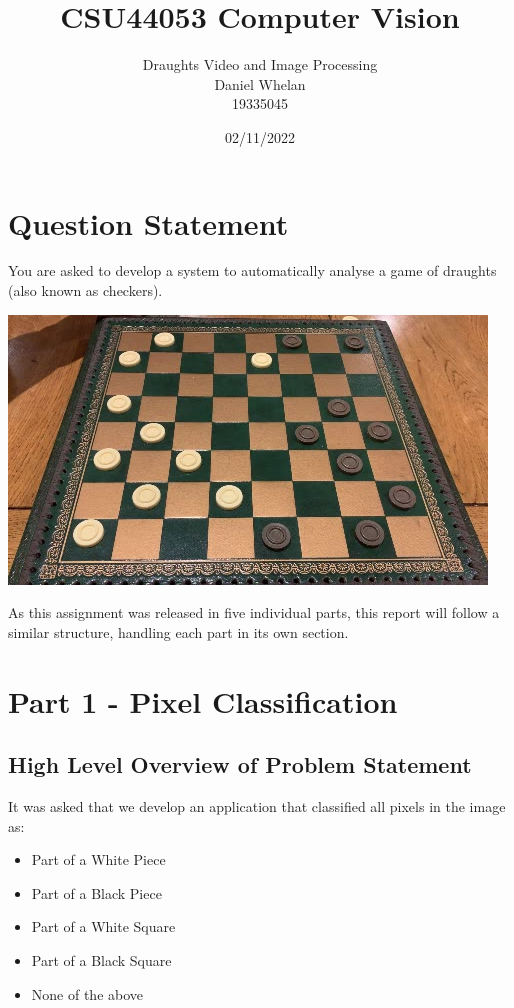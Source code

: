\documentclass[12pt]{article}
\title{CSU44053 Computer Vision}
\author{Draughts Video and Image Processing \\ Daniel Whelan \\ 19335045}
\date{02/11/2022}
\begin{document}
\maketitle
\newpage

    \section*{Question Statement}
    You are asked to develop a system to automatically analyse a game of draughts (also known as checkers).
    \begin{center}
        \includegraphics[scale=0.5]{DraughtsGame1Move13.png}
    \end{center}
    As this assignment was released in five individual parts, this report will follow a similar structure, handling each part in its own section.
    \newpage
    
    \section{Part 1 - Pixel Classification}
    \subsection{High Level Overview of Problem Statement}
    It was asked that we develop an application that classified all pixels in the image as:
    \begin{itemize}
        \item Part of a White Piece
        \item Part of a Black Piece
        \item Part of a White Square
        \item Part of a Black Square
        \item None of the above
    \end{itemize}
\end{document}
